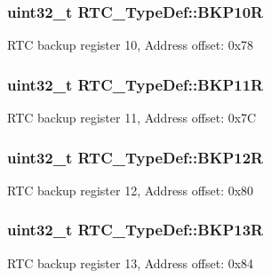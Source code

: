 \subsubsection[{\texorpdfstring{B\+K\+P10R}{BKP10R}}]{ uint32\+\_\+t R\+T\+C\+\_\+\+Type\+Def\+::\+B\+K\+P10R}\hypertarget{struct_r_t_c___type_def_a5feba3d5adae3f234b3d172459163c5a}{}\label{struct_r_t_c___type_def_a5feba3d5adae3f234b3d172459163c5a}
R\+TC backup register 10, Address offset\+: 0x78 
\subsubsection[{\texorpdfstring{B\+K\+P11R}{BKP11R}}]{ uint32\+\_\+t R\+T\+C\+\_\+\+Type\+Def\+::\+B\+K\+P11R}\hypertarget{struct_r_t_c___type_def_a8fef38e1e122778601e18f5b757c037a}{}\label{struct_r_t_c___type_def_a8fef38e1e122778601e18f5b757c037a}
R\+TC backup register 11, Address offset\+: 0x7C 
\subsubsection[{\texorpdfstring{B\+K\+P12R}{BKP12R}}]{ uint32\+\_\+t R\+T\+C\+\_\+\+Type\+Def\+::\+B\+K\+P12R}\hypertarget{struct_r_t_c___type_def_a6606b5d249f923aa15ab74b382cbaf7e}{}\label{struct_r_t_c___type_def_a6606b5d249f923aa15ab74b382cbaf7e}
R\+TC backup register 12, Address offset\+: 0x80 
\subsubsection[{\texorpdfstring{B\+K\+P13R}{BKP13R}}]{ uint32\+\_\+t R\+T\+C\+\_\+\+Type\+Def\+::\+B\+K\+P13R}\hypertarget{struct_r_t_c___type_def_a138903d4681455a660dccbaf3409263d}{}\label{struct_r_t_c___type_def_a138903d4681455a660dccbaf3409263d}
R\+TC backup register 13, Address offset\+: 0x84 
